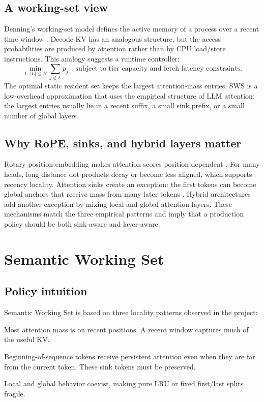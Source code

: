 \documentclass[11pt]{article}
\newcommand{\fullmethod}{Semantic Working Set}
\newcommand{\sws}{SWS}
\theoremstyle{definition}
\theoremstyle{plain}
\begin{document}
\subsection{A working-set view}
Denning's working-set model defines the active memory of a process over a recent time window \citep{denning1968working}.  Decode KV has an analogous structure, but the access probabilities are produced by attention rather than by CPU load/store instructions.  This analogy suggests a runtime controller:
\begin{equation}
  \min_{L: |L|\le B} \sum_{j\notin L} p_j \quad \text{subject to tier capacity and fetch latency constraints.}
\end{equation}
The optimal static resident set keeps the largest attention-mass entries.  \sws{} is a low-overhead approximation that uses the empirical structure of LLM attention: the largest entries usually lie in a recent suffix, a small sink prefix, or a small number of global layers.

\subsection{Why RoPE, sinks, and hybrid layers matter}
Rotary position embedding makes attention scores position-dependent \citep{su2021roformer}.  For many heads, long-distance dot products decay or become less aligned, which supports recency locality.  Attention sinks create an exception: the first tokens can become global anchors that receive mass from many later tokens \citep{streamingllm}.  Hybrid architectures add another exception by mixing local and global attention layers.  These mechanisms match the three empirical patterns and imply that a production policy should be both sink-aware and layer-aware.

\section{Semantic Working Set}
\label{sec:method}

\subsection{Policy intuition}
\fullmethod{} is based on three locality patterns observed in the project:
\begin{description}[leftmargin=1.5em,itemsep=2pt]
  \item[Local-dominant.] Most attention mass is on recent positions.  A recent window captures much of the useful KV.
  \item[Sink-dominant.] Beginning-of-sequence tokens receive persistent attention even when they are far from the current token.  These sink tokens must be preserved.
  \item[Hybrid.] Local and global behavior coexist, making pure LRU or fixed first/last splits fragile.
\end{description}
\end{document}
